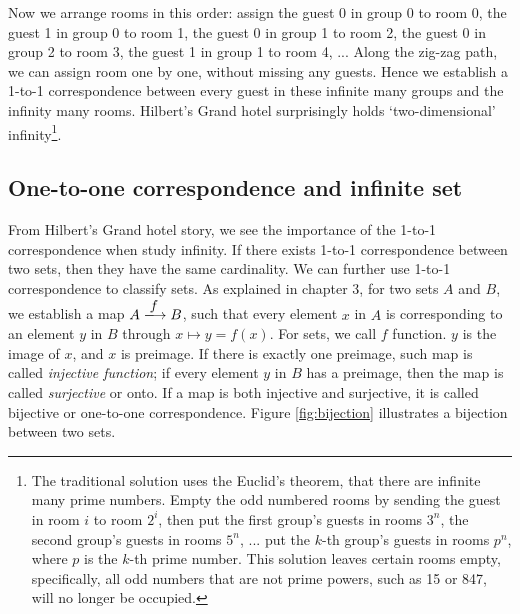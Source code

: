 \documentclass{article}
\begin{document}
Now we arrange rooms in this order: assign the guest 0 in group 0 to room 0, the guest 1 in group 0 to room 1, the guest 0 in group 1 to room 2, the guest 0 in group 2 to room 3, the guest 1 in group 1 to room 4, ... Along the zig-zag path, we can assign room one by one, without missing any guests. Hence we establish a 1-to-1 correspondence between every guest in these infinite many groups and the infinity many rooms. Hilbert's Grand hotel surprisingly holds `two-dimensional' infinity\footnote{The traditional solution uses the Euclid's theorem, that there are infinite many prime numbers. Empty the odd numbered rooms by sending the guest in room $i$ to room $2^{i}$, then put the first group's guests in rooms $3^{n}$, the second group's guests in rooms $5^{n}$, ... put the $k$-th group's guests in rooms $p^n$, where $p$ is the $k$-th prime number. This solution leaves certain rooms empty, specifically, all odd numbers that are not prime powers, such as 15 or 847, will no longer be occupied.}.

\begin{Exercise}
\end{Exercise}

\subsection{One-to-one correspondence and infinite set}

From Hilbert's Grand hotel story, we see the importance of the 1-to-1 correspondence when study infinity. If there exists 1-to-1 correspondence between two sets, then they have the same cardinality. We can further use 1-to-1 correspondence to classify sets. As explained in chapter 3, for two sets $A$ and $B$, we establish a map $A \arrowto{f} B$, such that every element $x$ in $A$ is corresponding to an element $y$ in $B$ through $x \mapsto y = f(x)$. For sets, we call $f$ function. $y$ is the image of $x$, and $x$ is preimage. If there is exactly one preimage, such map is called {\em injective function}; if every element $y$ in $B$ has a preimage, then the map is called {\em surjective} or onto. If a map is both injective and surjective, it is called bijective or one-to-one correspondence. Figure \ref{fig:bijection} illustrates a bijection between two sets.
\end{document}
